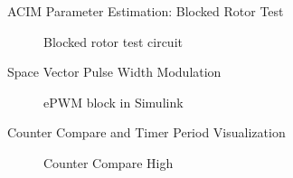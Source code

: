 \begin{frame}{ACIM Parameter Estimation: Blocked Rotor Test}
	\begin{figure}
		\centering


		\caption{Blocked rotor test circuit}
	\end{figure}
\end{frame}

\begin{frame}{Space Vector Pulse Width Modulation}
	\begin{figure}
		\centering


		\caption{ePWM block in Simulink}
	\end{figure}
\end{frame}



\begin{frame}{Counter Compare and Timer Period Visualization}
	\begin{figure}
		\centering
		\caption{Counter Compare High}
	\end{figure}
\end{frame}

